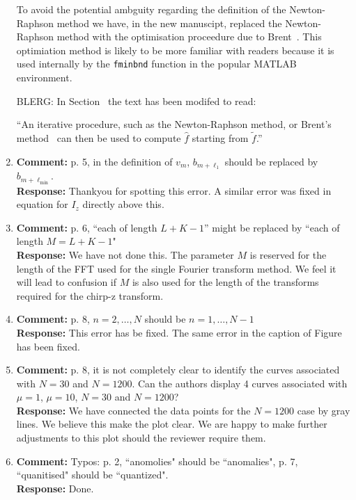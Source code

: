 \documentclass[a4paper,10pt]{article}
\begin{document}
\begin{enumerate}
To avoid the potential ambguity regarding the definition of the Newton-Raphson method we have, in the new manuscipt, replaced the Newton-Raphson method with the optimisation proceedure due to Brent~\cite[Ch.~5]{Brent_opt_no_derivs_1973}.  This optimiation method is likely to be more familiar with readers because it is used internally by the \texttt{fminbnd} function in the popular MATLAB environment.

BLERG: In Section~ the text has been modifed to read:

``An iterative procedure, such as the Newton-Raphson method, or Brent's method~\cite{Brent_opt_no_derivs_1973} 
can then be used to compute $\hat{f}$ starting from $\widetilde{f}$.''



\item\textbf{Comment:}
p. 5, in the definition of $v_m$, $b_{m+\ell_1}$ should be replaced by $b_{m+\ell_{\text{min}}}$.
\\
\textbf{Response:}
Thankyou for spotting this error.  A similar error was fixed in equation for $I_z$ directly above this. 


\item\textbf{Comment:}
p. 6, ``each of length $L+K-1$'' might be replaced by ``each of length $M = L + K - 1$"
\\
\textbf{Response:}
We have not done this.  The parameter $M$ is reserved for the length of the FFT used for the single Fourier transform method.  We feel it will lead to confusion if $M$ is also used for the length of the transforms required for the chirp-z transform.


\item\textbf{Comment:}
p. 8, $n = 2,\dots,N$ should be $n = 1, \dots, N - 1$
\\
\textbf{Response:}
This error has be fixed.  The same error in the caption of Figure~ has been fixed.


\item\textbf{Comment:}
p. 8, it is not completely clear to identify the curves associated with $N = 30$ and $N = 1200$. Can the authors display 4 curves associated with $\mu= 1$, $\mu = 10$, $N = 30$ and $N = 1200$?
\\
\textbf{Response:}
We have connected the data points for the $N=1200$ case by gray lines.  We believe this make the plot clear.  We are happy to make further adjustments to this plot should the reviewer require them. 

\item\textbf{Comment:}
Typos: p. 2, “anomolies" should be “anomalies", p. 7, “quanitised" should be
“quantized".
\\
\textbf{Response:}
Done.



\end{enumerate}
\end{document}
